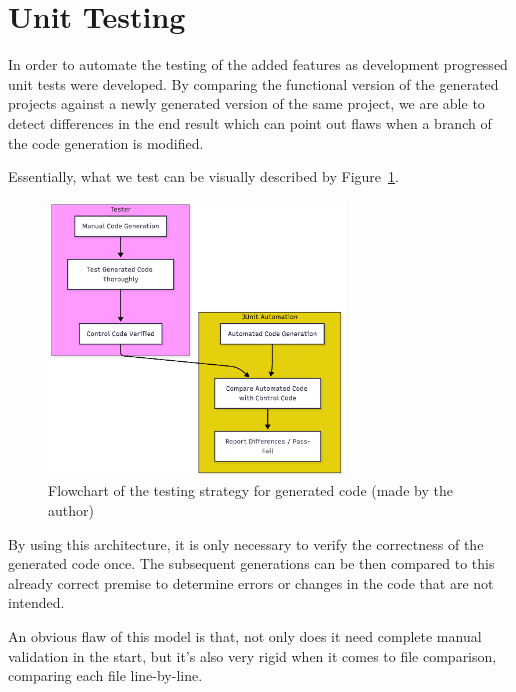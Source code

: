 \section{Unit Testing}
\label{sec:test_unit}

In order to automate the testing of the added features as development progressed unit tests were developed. By comparing the functional version of the generated projects against a newly generated version of the same project, we are able to detect differences in the end result which can point out flaws when a branch of the code generation is modified. 

Essentially, what we test can be visually described by Figure~\ref{fig:testingFlowchart}.

\begin{figure}[htbp]
	\centering
	\includegraphics[width=0.7\textwidth]{testingFlowchart.png}
	\caption{Flowchart of the testing strategy for generated code (made by the author)}
	\label{fig:testingFlowchart}
\end{figure}

By using this architecture, it is only necessary to verify the correctness of the generated code once. The subsequent generations can be then compared to this already correct premise to determine errors or changes in the code that are not intended.

An obvious flaw of this model is that, not only does it need complete manual validation in the start, but it's also very rigid when it comes to file comparison, comparing each file line-by-line.


